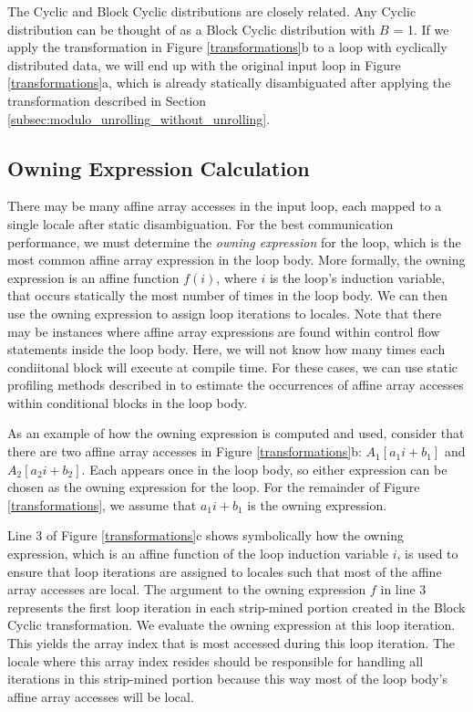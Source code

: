 The Cyclic and Block Cyclic distributions are closely related. Any Cyclic distribution can be thought of as a Block Cyclic distribution with $B$ = 1. If we apply the transformation in Figure \ref{transformations}b to a loop with cyclically distributed data, we will end up with the original input loop in Figure \ref{transformations}a, which is already statically disambiguated after applying the transformation described in Section \ref{subsec:modulo_unrolling_without_unrolling}. 

\subsection{Owning Expression Calculation}\label{subsec:owning_expression_calculation}

There may be many affine array accesses in the input loop, each mapped to a single locale after static disambiguation. For the best communication performance, we must determine the \textit{owning expression} for the loop, which is the most common affine array expression in the loop body. More formally, the owning expression is an affine function $f(i)$, where $i$ is the loop's induction variable, that occurs statically the most number of times in the loop body. We can then use the owning expression to assign loop iterations to locales. Note that there may be instances where affine array expressions are found within control flow statements inside the loop body. Here, we will not know how many times each condiitonal block will execute at compile time. For these cases, we can use static profiling methods described in \cite{wu1994static} to estimate the occurrences of affine array accesses within conditional blocks in the loop body.  

As an example of how the owning expression is computed and used, consider that there are two affine array accesses in Figure \ref{transformations}b: $A_{1}[a_{1}i+b_{1}]$ and $A_{2}[a_{2}i+b_{2}]$. Each appears once in the loop body, so either expression can be chosen as the owning expression for the loop. For the remainder of Figure \ref{transformations}, we assume that $a_{1}i+b_{1}$ is the owning expression. 

Line 3 of Figure \ref{transformations}c shows symbolically how the owning expression, which is an affine function of the loop induction variable $i$, is used to ensure that loop iterations are assigned to locales such that most of the affine array accesses are local. The argument to the owning expression $f$ in line 3 represents the first loop iteration in each strip-mined portion created in the Block Cyclic transformation. We evaluate the owning expression at this loop iteration. This yields the array index that is most accessed during this loop iteration. The locale where this array index resides should be responsible for handling all iterations in this strip-mined portion because this way most of the loop body's affine array accesses will be local.

